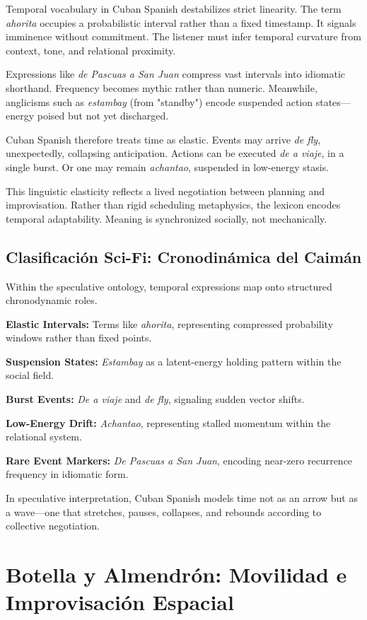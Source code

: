 \documentclass[12pt]{article}
\begin{document}
Temporal vocabulary in Cuban Spanish destabilizes strict linearity. The term \textit{ahorita} occupies a probabilistic interval rather than a fixed timestamp. It signals imminence without commitment. The listener must infer temporal curvature from context, tone, and relational proximity.

Expressions like \textit{de Pascuas a San Juan} compress vast intervals into idiomatic shorthand. Frequency becomes mythic rather than numeric. Meanwhile, anglicisms such as \textit{estambay} (from "standby") encode suspended action states---energy poised but not yet discharged.

Cuban Spanish therefore treats time as elastic. Events may arrive \textit{de fly}, unexpectedly, collapsing anticipation. Actions can be executed \textit{de a viaje}, in a single burst. Or one may remain \textit{achantao}, suspended in low-energy stasis.

This linguistic elasticity reflects a lived negotiation between planning and improvisation. Rather than rigid scheduling metaphysics, the lexicon encodes temporal adaptability. Meaning is synchronized socially, not mechanically.

\subsection*{Clasificación Sci-Fi: Cronodinámica del Caimán}

Within the speculative ontology, temporal expressions map onto structured chronodynamic roles.

\textbf{Elastic Intervals:} Terms like \textit{ahorita}, representing compressed probability windows rather than fixed points.

\textbf{Suspension States:} \textit{Estambay} as a latent-energy holding pattern within the social field.

\textbf{Burst Events:} \textit{De a viaje} and \textit{de fly}, signaling sudden vector shifts.

\textbf{Low-Energy Drift:} \textit{Achantao}, representing stalled momentum within the relational system.

\textbf{Rare Event Markers:} \textit{De Pascuas a San Juan}, encoding near-zero recurrence frequency in idiomatic form.

In speculative interpretation, Cuban Spanish models time not as an arrow but as a wave---one that stretches, pauses, collapses, and rebounds according to collective negotiation.

\section{Botella y Almendrón: Movilidad e Improvisación Espacial}
\end{document}
